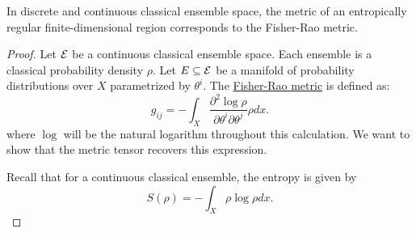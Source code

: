 \begin{mathSection}
\begin{prop}
	In discrete and continuous classical ensemble space, the metric of an entropically regular finite-dimensional region corresponds to the Fisher-Rao metric.
\end{prop}

\begin{proof}
	Let $\mathcal{E}$ be a continuous classical ensemble space. Each ensemble is a classical probability density $\rho$. Let $E \subseteq \mathcal{E}$ be a manifold of probability distributions over $X$ parametrized by $\theta^i$. The \href{https://en.wikipedia.org/wiki/Fisher_information_metric}{Fisher-Rao metric} is defined as:
	\begin{equation}
		g_{ij} =- \int_X \frac{\partial^2 \log \rho}{\partial \theta^i \partial \theta^j} \rho dx.
	\end{equation}
	where $\log$ will be the natural logarithm throughout this calculation. We want to show that the metric tensor recovers this expression.
	
	Recall that for a continuous classical ensemble, the entropy is given by
	\begin{equation}
		S(\rho) =- \int_X \rho \log \rho dx.
	\end{equation}
	

\end{proof}
\end{mathSection}
